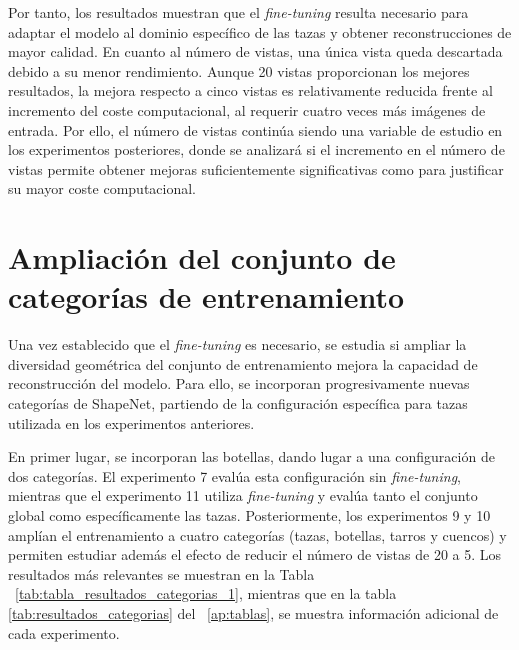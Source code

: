 \documentclass[10pt,a4paper]{report}
\begin{document}
Por tanto, los resultados muestran que el \textit{fine-tuning} resulta necesario para adaptar el modelo al dominio específico de las tazas y obtener reconstrucciones de mayor calidad. En cuanto al número de vistas, una única vista queda descartada debido a su menor rendimiento. Aunque 20 vistas proporcionan los mejores resultados, la mejora respecto a cinco vistas es relativamente reducida frente al incremento del coste computacional, al requerir cuatro veces más imágenes de entrada. Por ello, el número de vistas continúa siendo una variable de estudio en los experimentos posteriores, donde se analizará si el incremento en el número de vistas permite obtener mejoras suficientemente significativas como para justificar su mayor coste computacional.


\section{Ampliación del conjunto de categorías de entrenamiento}
\label{sec:mas_categorias}

Una vez establecido que el \textit{fine-tuning} es necesario, se estudia si ampliar la diversidad geométrica del conjunto de entrenamiento mejora la capacidad de reconstrucción del modelo. Para ello, se incorporan progresivamente nuevas categorías de ShapeNet, partiendo de la configuración específica para tazas utilizada en los experimentos anteriores.

En primer lugar, se incorporan las botellas, dando lugar a una configuración de dos categorías. El experimento 7 evalúa esta configuración sin \textit{fine-tuning}, mientras que el experimento 11 utiliza \textit{fine-tuning} y evalúa tanto el conjunto global como específicamente las tazas. Posteriormente, los experimentos 9 y 10 amplían el entrenamiento a cuatro categorías (tazas, botellas, tarros y cuencos) y permiten estudiar además el efecto de reducir el número de vistas de 20 a 5. Los resultados más relevantes se muestran en la Tabla ~\ref{tab:tabla_resultados_categorias_1}, mientras que en la tabla \ref{tab:resultados_categorias} del ~\ref{ap:tablas}, se muestra información adicional de cada experimento.
\end{document}
